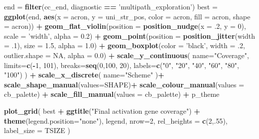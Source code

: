 \documentclass[]{book}
\newenvironment{Shaded}{\begin{snugshade}}{\end{snugshade}}
\newcommand{\DataTypeTok}[1]{\textcolor[rgb]{0.13,0.29,0.53}{#1}}
\newcommand{\DecValTok}[1]{\textcolor[rgb]{0.00,0.00,0.81}{#1}}
\newcommand{\FloatTok}[1]{\textcolor[rgb]{0.00,0.00,0.81}{#1}}
\newcommand{\KeywordTok}[1]{\textcolor[rgb]{0.13,0.29,0.53}{\textbf{#1}}}
\newcommand{\NormalTok}[1]{#1}
\newcommand{\OperatorTok}[1]{\textcolor[rgb]{0.81,0.36,0.00}{\textbf{#1}}}
\newcommand{\OtherTok}[1]{\textcolor[rgb]{0.56,0.35,0.01}{#1}}
\newcommand{\StringTok}[1]{\textcolor[rgb]{0.31,0.60,0.02}{#1}}
\begin{document}
\begin{Shaded}
\begin{Highlighting}[]
\NormalTok{end =}\StringTok{ }\KeywordTok{filter}\NormalTok{(cc_end, diagnostic }\OperatorTok{==}\StringTok{ 'multipath_exploration'}\NormalTok{)}
\NormalTok{best =}\StringTok{ }\KeywordTok{ggplot}\NormalTok{(end, }\KeywordTok{aes}\NormalTok{(}\DataTypeTok{x =}\NormalTok{ acron, }\DataTypeTok{y =}\NormalTok{ uni_str_pos, }\DataTypeTok{color =}\NormalTok{ acron, }\DataTypeTok{fill =}\NormalTok{ acron, }\DataTypeTok{shape =}\NormalTok{ acron)) }\OperatorTok{+}
\StringTok{  }\KeywordTok{geom_flat_violin}\NormalTok{(}\DataTypeTok{position =} \KeywordTok{position_nudge}\NormalTok{(}\DataTypeTok{x =} \FloatTok{.2}\NormalTok{, }\DataTypeTok{y =} \DecValTok{0}\NormalTok{), }\DataTypeTok{scale =} \StringTok{'width'}\NormalTok{, }\DataTypeTok{alpha =} \FloatTok{0.2}\NormalTok{) }\OperatorTok{+}
\StringTok{  }\KeywordTok{geom_point}\NormalTok{(}\DataTypeTok{position =} \KeywordTok{position_jitter}\NormalTok{(}\DataTypeTok{width =} \FloatTok{.1}\NormalTok{), }\DataTypeTok{size =} \FloatTok{1.5}\NormalTok{, }\DataTypeTok{alpha =} \FloatTok{1.0}\NormalTok{) }\OperatorTok{+}
\StringTok{  }\KeywordTok{geom_boxplot}\NormalTok{(}\DataTypeTok{color =} \StringTok{'black'}\NormalTok{, }\DataTypeTok{width =} \FloatTok{.2}\NormalTok{, }\DataTypeTok{outlier.shape =} \OtherTok{NA}\NormalTok{, }\DataTypeTok{alpha =} \FloatTok{0.0}\NormalTok{) }\OperatorTok{+}
\StringTok{  }\KeywordTok{scale_y_continuous}\NormalTok{(}
    \DataTypeTok{name=}\StringTok{"Coverage"}\NormalTok{,}
    \DataTypeTok{limits=}\KeywordTok{c}\NormalTok{(}\OperatorTok{-}\DecValTok{1}\NormalTok{, }\DecValTok{101}\NormalTok{),}
    \DataTypeTok{breaks=}\KeywordTok{seq}\NormalTok{(}\DecValTok{0}\NormalTok{,}\DecValTok{100}\NormalTok{, }\DecValTok{20}\NormalTok{),}
    \DataTypeTok{labels=}\KeywordTok{c}\NormalTok{(}\StringTok{"0"}\NormalTok{, }\StringTok{"20"}\NormalTok{, }\StringTok{"40"}\NormalTok{, }\StringTok{"60"}\NormalTok{, }\StringTok{"80"}\NormalTok{, }\StringTok{"100"}\NormalTok{)}
\NormalTok{  ) }\OperatorTok{+}
\StringTok{  }\KeywordTok{scale_x_discrete}\NormalTok{(}
    \DataTypeTok{name=}\StringTok{"Scheme"}
\NormalTok{  )}\OperatorTok{+}
\StringTok{  }\KeywordTok{scale_shape_manual}\NormalTok{(}\DataTypeTok{values=}\NormalTok{SHAPE)}\OperatorTok{+}
\StringTok{  }\KeywordTok{scale_colour_manual}\NormalTok{(}\DataTypeTok{values =}\NormalTok{ cb_palette) }\OperatorTok{+}
\StringTok{  }\KeywordTok{scale_fill_manual}\NormalTok{(}\DataTypeTok{values =}\NormalTok{ cb_palette) }\OperatorTok{+}
\StringTok{  }\NormalTok{p_theme}

\KeywordTok{plot_grid}\NormalTok{(}
\NormalTok{  best }\OperatorTok{+}
\StringTok{    }\KeywordTok{ggtitle}\NormalTok{(}\StringTok{"Final activation gene coverage"}\NormalTok{) }\OperatorTok{+}
\StringTok{    }\KeywordTok{theme}\NormalTok{(}\DataTypeTok{legend.position=}\StringTok{"none"}\NormalTok{),}
\NormalTok{  legend,}
  \DataTypeTok{nrow=}\DecValTok{2}\NormalTok{,}
  \DataTypeTok{rel_heights =} \KeywordTok{c}\NormalTok{(}\DecValTok{2}\NormalTok{,.}\DecValTok{55}\NormalTok{),}
  \DataTypeTok{label_size =}\NormalTok{ TSIZE}
\NormalTok{)}
\end{Highlighting}
\end{Shaded}
\end{document}
